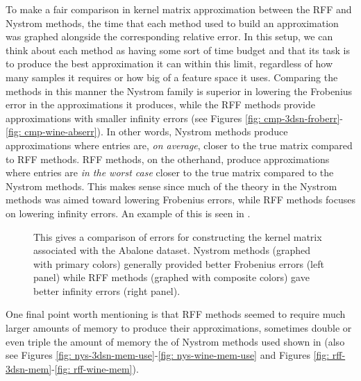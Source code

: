 To make a fair comparison in kernel matrix approximation between the RFF and Nystrom methods, the time that each method used to build an approximation was graphed alongside the corresponding relative error. In this setup, we can think about each method as having some sort of time budget and that its task is to produce the best approximation it can within this limit, regardless of how many samples it requires or how big of a feature space it uses. Comparing the methods in this manner the Nystrom family is superior in lowering the Frobenius error in the approximations it produces, while the RFF methods provide approximations with smaller infinity errors (see Figures \ref{fig: cmp-3dsn-froberr}-\ref{fig: cmp-wine-abserr}). In other words, Nystrom methods produce approximations where entries are, {\it on average}, closer to the true matrix compared to RFF methods. RFF methods, on the otherhand, produce approximations where entries are {\it in the worst case} closer to the true matrix compared to the Nystrom methods. This makes sense since much of the theory in the Nystrom methods was aimed toward lowering Frobenius errors, while RFF methods focuses on lowering infinity errors. An example of this is seen in .

\begin{figure}[H]
    \centering
    \caption{This gives a comparison of errors for constructing the kernel matrix associated with the Abalone dataset. Nystrom methods (graphed with primary colors) generally provided better Frobenius errors (left panel) while RFF methods (graphed with composite colors) gave better infinity errors (right panel).}
    \label{fig: nys-err-vs-rff-err}
\end{figure}

One final point worth mentioning is that RFF methods seemed to require much larger amounts of memory to produce their approximations, sometimes double or even triple the amount of memory the of Nystrom methods used shown in  (also see Figures \ref{fig: nys-3dsn-mem-use}-\ref{fig: nys-wine-mem-use} and Figures \ref{fig: rff-3dsn-mem}-\ref{fig: rff-wine-mem}).


